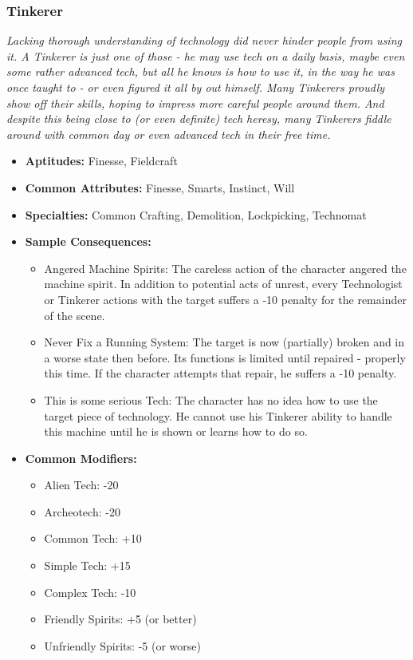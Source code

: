 \subsubsection{Tinkerer}\label{Tinkerer}
\textit{Lacking thorough understanding of technology did never hinder people from using it.
A Tinkerer is just one of those - he may use tech on a daily basis, maybe even some rather advanced tech, but all he knows is how to use it, in the way he was once taught to - or even figured it all by out himself.
Many Tinkerers proudly show off their skills, hoping to impress more careful people around them.
And despite this being close to (or even definite) tech heresy, many Tinkerers fiddle around with common day or even advanced tech in their free time.}
\begin{itemize}
	\item \textbf{Aptitudes:} Finesse, Fieldcraft
	\item \textbf{Common Attributes:} Finesse, Smarts, Instinct, Will
	\item \textbf{Specialties:} Common Crafting, Demolition, Lockpicking, Technomat
	\item \textbf{Sample Consequences:} 
	\begin{itemize}
		\item Angered Machine Spirits: The careless action of the character angered the machine spirit. In addition to potential acts of unrest, every Technologist or Tinkerer actions with the target suffers a -10 penalty for the remainder of the scene.
		\item Never Fix a Running System: The target is now (partially) broken and in a worse state then before. Its functions is limited until repaired - properly this time. If the character attempts that repair, he suffers a -10 penalty.
		\item This is some serious Tech: The character has no idea how to use the target piece of technology. He cannot use his Tinkerer ability to handle this machine until he is shown or learns how to do so.
	\end{itemize}
	\item \textbf{Common Modifiers:}
	\begin{itemize}
		\item Alien Tech: -20
		\item Archeotech: -20
		\item Common Tech: +10
		\item Simple Tech: +15
		\item Complex Tech: -10
		\item Friendly Spirits: +5 (or better)
		\item Unfriendly Spirits: -5 (or worse)
	\end{itemize}
\end{itemize}

